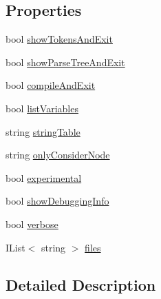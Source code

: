 \subsection*{Properties}
\begin{DoxyCompactItemize}
\item 
bool \hyperlink{a00192_ab1a387df201e3e136c15e5744219628d}{show\-Tokens\-And\-Exit}
\item 
bool \hyperlink{a00192_abef6bf44ae4792d7644b1c02de625208}{show\-Parse\-Tree\-And\-Exit}
\item 
bool \hyperlink{a00192_af9b6917244075618720f2a90bbe6ef56}{compile\-And\-Exit}
\item 
bool \hyperlink{a00192_a062775744f2d7144527fa3bca4b9b3ce}{list\-Variables}
\item 
string \hyperlink{a00103_a7e43c3b73722956cb0f5d507e4eef527}{string\-Table}
\item 
string \hyperlink{a00103_af4c0062a1d46281d377f87084fde374e}{only\-Consider\-Node}
\item 
bool \hyperlink{a00103_ad97950e47ce2aaeb598295b7c3c44b13}{experimental}
\item 
bool \hyperlink{a00041_a89964ea17bd19caf00cb5bff563ed01c}{show\-Debugging\-Info}
\item 
bool \hyperlink{a00041_ada4d83d1756918f362d55f6649b82b17}{verbose}
\item 
I\-List$<$ string $>$ \hyperlink{a00041_aa93cbb1bc1d5328e0a417012621e92d2}{files}
\end{DoxyCompactItemize}


\subsection{Detailed Description}


